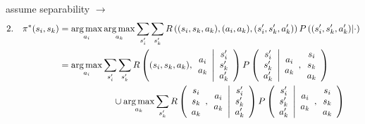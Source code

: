 \textasteriskcentered assume separability $\longrightarrow$\\
\begin{align*}
2.\quad \pi^\ast(s_i,s_k) & = \operatorname*{arg\,max}_{a_i} \operatorname*{arg\,max}_{a_k} \sum_{s^\prime_i} \sum_{s^\prime_k} R\left( ( s_i, s_k, a_k ), ( a_i, a_k ), ( s^\prime_i, s^\prime_k, a^\prime_k )\right) P\left( ( s^\prime_i, s^\prime_k, a^\prime_k ) \middle| \cdot \right) \\
& = \operatorname*{arg\,max}_{a_i} \sum_{s^\prime_i} \sum_{s^\prime_k} R\left(  ( s_i, s_k, a_k ),\begin{array}{c} a_i \\ a_k \end{array}
\middle| 
\begin{array}{c} s^\prime_i \\ s^\prime_k \\ a^\prime_k \end{array}
\right)
P\left( 
\begin{array}{c} s^\prime_i \\ s^\prime_k \\ a^\prime_k \end{array}
\middle | \begin{array}{c} a_i \\ a_k \end{array},
\begin{array}{c} s_i \\ s_k \\ a_k \end{array}
\right) \\
& \qquad \qquad \qquad
\cup
\operatorname*{arg\,max}_{a_k}
 \sum_{s^\prime_k} R\left(  \begin{array}{c} s_i \\ s_k \\ a_k \end{array},\begin{array}{c} a_i \\ a_k \end{array}
\middle| 
\begin{array}{c} s^\prime_i \\ s^\prime_k \\ a^\prime_k \end{array}
\right)
P\left( 
\begin{array}{c} s^\prime_i \\ s^\prime_k \\ a^\prime_k \end{array}
\middle | \begin{array}{c} a_i \\ a_k \end{array},
\begin{array}{c} s_i \\ s_k \\ a_k \end{array}
\right)
\end{align*}\\

